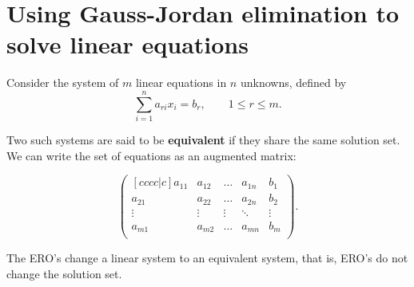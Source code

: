 \section{Using Gauss-Jordan elimination to solve linear equations}

Consider the system of $m$ linear equations in $n$ unknowns, defined by \[\sum_{i=1}^n{a_{ri}x_i}=b_r,\qquad1\leq r\leq m.\]

Two such systems are said to be \textbf{equivalent} if they share the same solution set. We can write the set of equations as an augmented matrix:

\[
    \begin{pmatrix}[cccc|c]
        a_{11}&a_{12}&\ldots&a_{1n}&b_1\\
        a_{21}&a_{22}&\ldots&a_{2n}&b_2\\
        \vdots&\vdots&\vdots&\ddots&\vdots\\
        a_{m1}&a_{m2}&\ldots&a_{mn}&b_m\\
    \end{pmatrix}
    .
\]

\begin{theorem}
    The ERO's change a linear system to an equivalent system, that is, ERO's do not change the solution set.
\end{theorem}

